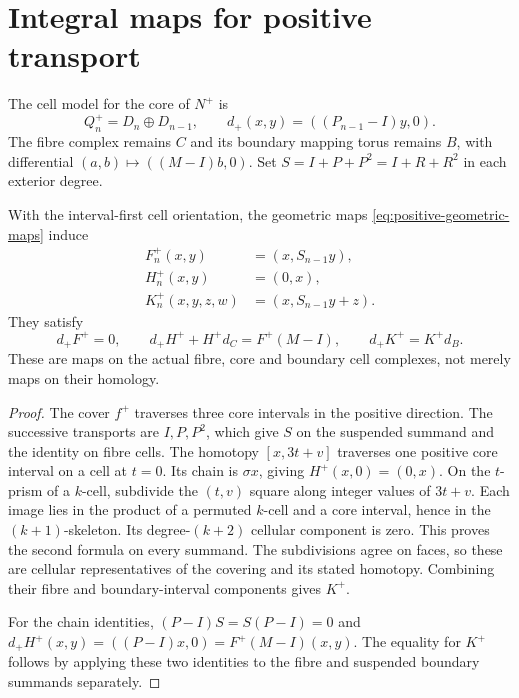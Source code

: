 \section{Integral maps for positive transport}

The cell model for the core of $N^+$ is
\begin{equation}\label{eq:Q-positive}
 Q^+_n=D_n\oplus D_{n-1},\qquad
 d_+(x,y)=((P_{n-1}-I)y,0).
\end{equation}
The fibre complex remains $C$ and its boundary mapping torus remains
$B$, with differential $(a,b)\mapsto((M-I)b,0)$.
Set $S=I+P+P^2=I+R+R^2$ in each exterior degree.

\begin{theorem}\label{thm:positive-chains}
With the interval-first cell orientation, the geometric maps
\eqref{eq:positive-geometric-maps} induce
\begin{equation}\label{eq:positive-FHK}
 \begin{split}
 F^+_n(x,y)&=(x,S_{n-1}y),\\
 H^+_n(x,y)&=(0,x),\\
 K^+_n(x,y,z,w)&=(x,S_{n-1}y+z).
 \end{split}
\end{equation}
They satisfy
\begin{equation}\label{eq:positive-identities}
 d_+F^+=0,\qquad d_+H^++H^+d_C=F^+(M-I),
 \qquad d_+K^+=K^+d_B.
\end{equation}
These are maps on the actual fibre, core and boundary cell complexes,
not merely maps on their homology.
\end{theorem}
\begin{proof}
The cover $f^+$ traverses three core intervals in the positive
direction. The successive transports are $I,P,P^2$, which give
$S$ on the suspended summand and the identity on fibre cells.
The homotopy $[x,3t+v]$ traverses one positive core interval on
a cell at $t=0$. Its chain is $\sigma x$, giving $H^+(x,0)=(0,x)$.
On the $t$-prism of a $k$-cell, subdivide the $(t,v)$ square along
integer values of $3t+v$. Each image lies in the product of a
permuted $k$-cell and a core interval, hence in the $(k+1)$-skeleton.
Its degree-$(k+2)$ cellular component is zero. This proves the second
formula on every summand. The subdivisions agree on faces, so these
are cellular representatives of the covering and its stated homotopy.
Combining their fibre and boundary-interval components gives $K^+$.

For the chain identities, $(P-I)S=S(P-I)=0$ and
$d_+H^+(x,y)=((P-I)x,0)=F^+(M-I)(x,y)$.
The equality for $K^+$ follows by applying these two identities to
the fibre and suspended boundary summands separately.
\end{proof}

